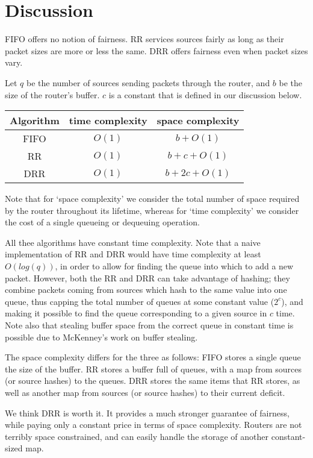 
\section{Discussion}

FIFO offers no notion of fairness.
RR services sources fairly as long as their packet sizes are more or less the same.
DRR offers fairness even when packet sizes vary.

Let $q$ be the number of sources sending packets through the router, and $b$ be the size of the router's buffer.
$c$ is a constant that is defined in our discussion below.

\begin{center}
\begin{tabular}{|c|c|c|}
\hline
Algorithm & time complexity & space complexity \\ \hline \hline
FIFO & $O(1)$ & $b + O(1)$ \\ \hline
RR & $O(1)$ & $b + c + O(1)$ \\ \hline
DRR & $O(1)$ & $b + 2c + O(1)$ \\ \hline
\end{tabular}
\end{center}

Note that for `space complexity' we consider the total number of space required by the router throughout its lifetime, whereas for `time complexity' we consider the cost of a single queueing or dequeuing operation. 

All thee algorithms have constant time complexity.
Note that a naive implementation of RR and DRR would have time complexity at least $O(log(q))$, in order to allow for finding the queue into which to add a new packet.
However, both the RR and DRR can take advantage of hashing; they combine packets coming from sources which hash to the same value into one queue, thus capping the total number of queues at some constant value ($2^c$), and making it possible to find the queue corresponding to a given source in $c$ time.
Note also that stealing buffer space from the correct queue in constant time is possible due to McKenney's work on buffer stealing.

The space complexity differs for the three as follows: 
FIFO stores a single queue the size of the buffer.
RR stores a buffer full of queues, with a map from sources (or source hashes) to the queues.
DRR stores the same items that RR stores, as well as another map from sources (or source hashes) to their current deficit.

We think DRR is worth it. 
It provides a much stronger guarantee of fairness, 
while paying only a constant price in terms of space complexity. 
Routers are not terribly space constrained, and can easily handle the storage of another constant-sized map.

